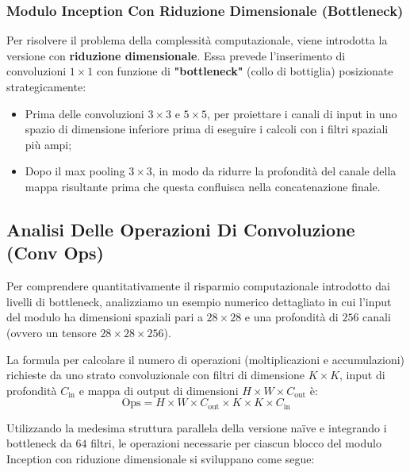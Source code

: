 ﻿\documentclass[11pt, a4paper]{article}
\begin{document}
\subsubsection{Modulo Inception Con Riduzione Dimensionale (Bottleneck)}

Per risolvere il problema della complessità computazionale, viene introdotta la versione con \textbf{riduzione dimensionale}. Essa prevede l'inserimento di convoluzioni $1\times1$ con funzione di \textbf{"bottleneck"} (collo di bottiglia) posizionate strategicamente:
\begin{itemize}
    \item Prima delle convoluzioni $3\times3$ e $5\times5$, per proiettare i canali di input in uno spazio di dimensione inferiore prima di eseguire i calcoli con i filtri spaziali più ampi;
    \item Dopo il max pooling $3\times3$, in modo da ridurre la profondità del canale della mappa risultante prima che questa confluisca nella concatenazione finale.
\end{itemize}


\subsection{Analisi Delle Operazioni Di Convoluzione (Conv Ops)}

Per comprendere quantitativamente il risparmio computazionale introdotto dai livelli di bottleneck, analizziamo un esempio numerico dettagliato in cui l'input del modulo ha dimensioni spaziali pari a $28\times28$ e una profondità di $256$ canali (ovvero un tensore $28\times28\times256$).

La formula per calcolare il numero di operazioni (moltiplicazioni e accumulazioni) richieste da uno strato convoluzionale con filtri di dimensione $K \times K$, input di profondità $C_{\text{in}}$ e mappa di output di dimensioni $H \times W \times C_{\text{out}}$ è:
\[ \text{Ops} = H \times W \times C_{\text{out}} \times K \times K \times C_{\text{in}} \]

Utilizzando la medesima struttura parallela della versione naïve e integrando i bottleneck da $64$ filtri, le operazioni necessarie per ciascun blocco del modulo Inception con riduzione dimensionale si sviluppano come segue:
\end{document}
